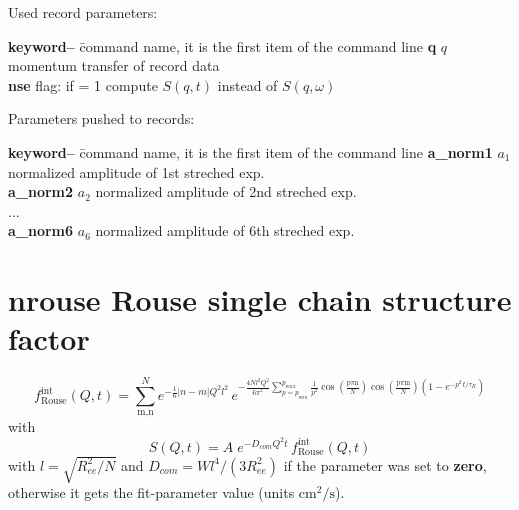 \documentclass[11pt,fleqn]{book} %
\newcommand{\linespace}{\vspace{4ex}}
\newcommand{\desc}[1]{\hskip 0.5cm {\color{descgray} #1}}
\begin{document}
\linespace
Used record parameters: 
\begin{tabbing}
\textbf{keyword--}  \= command name, it is the first item of the command line                    \kill
\textbf{q   } \>  $q$ momentum transfer of record data         \\         
\textbf{nse } \>  flag: if = 1 compute $S(q,t)$ instead of $S(q,\omega)$        \\         
\end{tabbing}

\linespace
Parameters pushed to records:
\begin{tabbing}
\textbf{keyword--}  \= command name, it is the first item of the command line                    \kill
\textbf{a\_norm1} \>  $a_1$ normalized amplitude of 1st streched exp.   \\         
\textbf{a\_norm2} \>  $a_2$ normalized amplitude of 2nd streched exp.   \\ 
... \\        
\textbf{a\_norm6} \>  $a_6$ normalized amplitude of 6th streched exp.   \\         
  
\end{tabbing}




\chapter{nrouse \desc{Rouse single chain structure factor }}


\begin{exercise}


\begin{equation}
\label{eq:rous}
f_{\text{Rouse}}^{\text{int}}\left( Q,t \right)\mathbf{=}\sum_{\text{m,n}}^{N}{e^{ - \frac{1}{6}|n - m| Q^{2}l^{2} } } \, e^{ - \frac{4 N l^{2}Q^2}{6 \pi^{2}}\sum_{p=p_{min}}^{p_{max}}{\frac{1}{p^{2}}\cos\left( \frac{\text{p$\pi$n}}{N} \right)}\cos\left( \frac{\text{p$\pi$m}}{N} \right)\left( 1 - e^{ - p^{2}\,{t}/{\tau_{R}} } \right) }
\end{equation}
with
\begin{equation}
\label{eq:rousD}
S(Q,t) = A \;e^{ - D_{com} Q^{2} t }\,f_{\mathrm{Rouse}}^{\mathrm{int}}\left( Q,t \right)
\end{equation}
with  $ l = \sqrt{R_{ee}^2/N}  $  
and
$D_{com} = W l^4 / (3 R_{ee}^2) $ if the parameter was set to {\bf zero}, otherwise 
it gets the fit-parameter value (units $\mathrm{cm^2/s}$).
\end{exercise}
\end{document}
